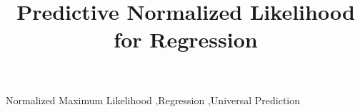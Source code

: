\documentclass[final,1p,times]{elsarticle}
\begin{document}
\begin{frontmatter}

\title{Predictive Normalized Likelihood for Regression}



\begin{abstract}

\end{abstract}

\begin{keyword}
Normalized Maximum Likelihood \sep Regression \sep Universal Prediction
\end{keyword}

\end{frontmatter}


\end{document}
